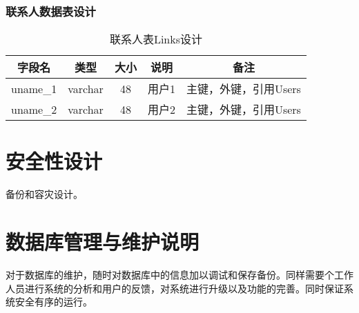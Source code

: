 \subsubsection{联系人数据表设计}
\begin{table}[htbp]
\centering
\caption{联系人表Links设计} \label{tab:order-database}
\begin{tabular}{|c|c|c|c|c|}
    \hline
    字段名 & 类型 & 大小 & 说明 & 备注 \\
    \hline
    uname\_1 & varchar & 48 & 用户1 & 主键，外键，引用Users\\
    \hline
    uname\_2 & varchar & 48 & 用户2 & 主键，外键，引用Users \\
    \hline
\end{tabular}
\end{table}
\section{安全性设计}
备份和容灾设计。

\section{数据库管理与维护说明}
对于数据库的维护，随时对数据库中的信息加以调试和保存备份。同样需要个工作人员进行系统的分析和用户的反馈，对系统进行升级以及功能的完善。同时保证系统安全有序的运行。
